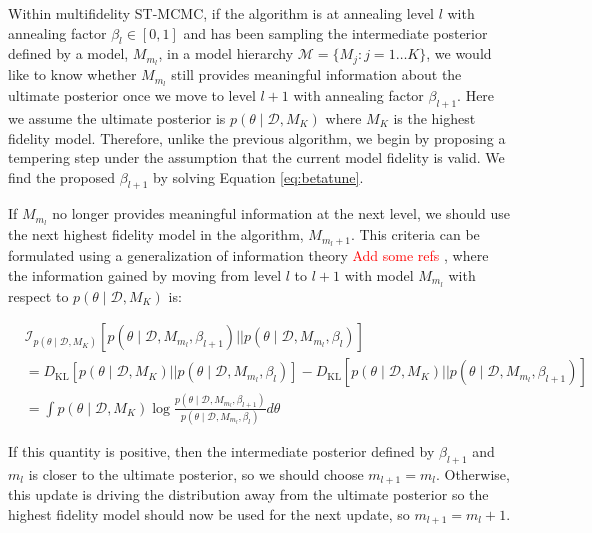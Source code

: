\documentclass[1p]{article}
\begin{document}
Within  multifidelity ST-MCMC, if the algorithm is at annealing level $l$ with annealing factor $\beta_l \in \left [0, 1\right ]$ and has been sampling the intermediate posterior defined by a model, $M_{m_l}$, in a model hierarchy $\mathcal{M} = \{ M_j : j = 1 \dots K\}$, we would like to know whether $M_{m_l}$ still provides meaningful information about the ultimate posterior once we move to level $l+1$ with annealing factor $\beta_{l+1}$. Here we assume the ultimate posterior is $p \left (\theta \mid \mathcal{D}, M_K \right )$ where $M_K$ is the highest fidelity model. Therefore, unlike the previous algorithm, we begin by proposing a tempering step under the assumption that the current model fidelity is valid. We find the proposed $\beta_{l+1}$ by solving Equation \ref{eq:betatune}.

If $M_{m_l}$ no longer provides meaningful information at the next level, we should use the next highest fidelity model in the algorithm, $M_{m_l+1}$. This criteria can be formulated using a generalization of information theory \textcolor{red}{Add some refs} , where the information gained by moving from level $l$ to $l+1$ with model $M_{m_l}$ with respect to $p \left (\theta \mid \mathcal{D}, M_K \right )$ is:

\begin{equation}
\begin{split}
&\mathcal{I}_{p \left (\theta \mid \mathcal{D}, M_K \right )} \left [ p \left (\theta \mid \mathcal{D}, M_{m_l}, \beta_{l+1} \right ) || p \left (\theta \mid \mathcal{D}, M_{m_l}, \beta_l \right )\right ]\\
&=D_{\text{KL}} \left [p \left (\theta \mid \mathcal{D}, M_K \right ) || p \left (\theta \mid \mathcal{D}, M_{m_l}, \beta_l \right )\right ] -D_{\text{KL}} \left [p \left (\theta \mid \mathcal{D}, M_K \right ) || p \left (\theta \mid \mathcal{D}, M_{m_l}, \beta_{l+1} \right )\right ]\\
&=\int p \left (\theta \mid \mathcal{D}, M_K \right ) \log \frac{p \left (\theta \mid \mathcal{D}, M_{m_l}, \beta_{l+1} \right )}{p \left (\theta \mid \mathcal{D}, M_{m_l}, \beta_l \right )} d\theta
\end{split}
\label{eq:info}
\end{equation}

\noindent If this quantity is positive, then the intermediate posterior defined by $\beta_{l+1}$ and $m_l$ is closer to the ultimate posterior, so we should choose $m_{l+1} = m_{l}$. Otherwise, this update is driving the distribution away from the ultimate posterior so the highest fidelity model should now be used for the next update, so $m_{l+1} = m_{l}+1$.
\end{document}

